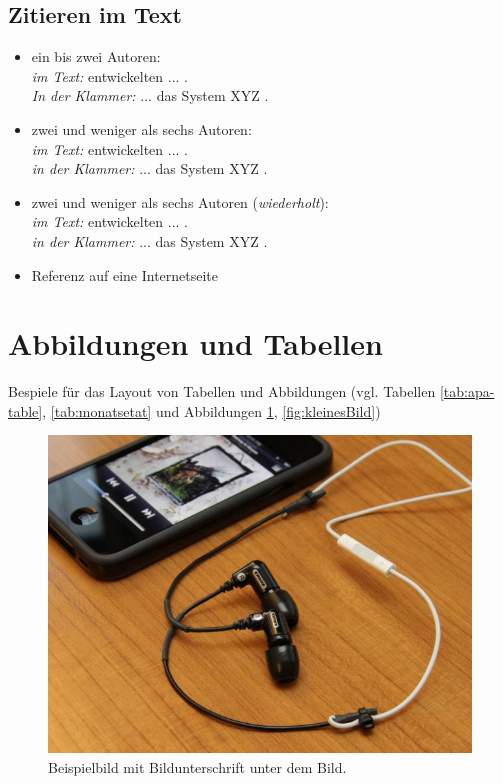 \subsection{Zitieren im Text}
\begin{itemize}
\item ein bis zwei Autoren:\\ \emph{im Text:} \textcite{oberdorfer:2013a} entwickelten ... . \\ \emph{In der Klammer:} ... das System XYZ \parencite{rehfeld-latoschik:parallelisierung:2009}.
\item zwei und weniger als sechs Autoren:\\ \emph{im Text:} \textcite{lukas:2010} entwickelten ... .\\ \emph{in der Klammer:} ... das System XYZ \parencite{fischbach:2012b}.
\item zwei und weniger als sechs Autoren (\emph{wiederholt}):\\ \emph{im Text:} \textcite{lukas:2010} entwickelten ... .\\ \emph{in der Klammer:} ... das System XYZ \parencite{fischbach:2012b}.
\item Referenz auf eine Internetseite \parencite{hci:2013}
\end{itemize}

\section{Abbildungen und Tabellen}
Bespiele für das Layout von Tabellen und Abbildungen (vgl. Tabellen \ref{tab:apa-table}, \ref{tab:monatsetat} und Abbildungen \ref{fig:grossesBild}, \ref{fig:kleinesBild})

\begin{figure}
\includegraphics[width=\textwidth]{figures/dummy2.jpg}
\caption{Beispielbild mit Bildunterschrift unter dem Bild.}
\label{fig:grossesBild}
\end{figure}


